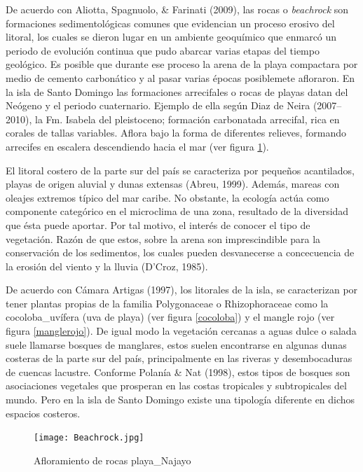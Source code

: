 \documentclass[11pt,]{article}
\begin{document}
De acuerdo con Aliotta, Spagnuolo, \& Farinati (2009), las rocas o
\emph{beachrock} son formaciones sedimentológicas comunes que evidencian
un proceso erosivo del litoral, los cuales se dieron lugar en un
ambiente geoquímico que enmarcó un periodo de evolución continua que
pudo abarcar varias etapas del tiempo geológico. Es posible que durante
ese proceso la arena de la playa compactara por medio de cemento
carbonático y al pasar varias épocas posiblemete afloraron. En la isla
de Santo Domingo las formaciones arrecifales o rocas de playas datan del
Neógeno y el periodo cuaternario. Ejemplo de ella según Diaz de Neira
(2007--2010), la Fm. Isabela del pleistoceno; formación carbonatada
arrecifal, rica en corales de tallas variables. Aflora bajo la forma de
diferentes relieves, formando arrecifes en escalera descendiendo hacia
el mar (ver figura \ref{beachrock_foto}).

El litoral costero de la parte sur del país se caracteriza por pequeños
acantilados, playas de origen aluvial y dunas extensas (Abreu, 1999).
Además, mareas con oleajes extremos típico del mar caribe. No obstante,
la ecología actúa como componente categórico en el microclima de una
zona, resultado de la diversidad que ésta puede aportar. Por tal motivo,
el interés de conocer el tipo de vegetación. Razón de que estos, sobre
la arena son imprescindible para la conservación de los sedimentos, los
cuales pueden desvanecerse a concecuencia de la erosión del viento y la
lluvia (D'Croz, 1985).

De acuerdo con Cámara Artigas (1997), los litorales de la isla, se
caracterizan por tener plantas propias de la familia Polygonaceae o
Rhizophoraceae como la cocoloba\_uvífera (uva de playa) (ver figura
\ref{cocoloba}) y el mangle rojo (ver figura \ref{manglerojo}). De igual
modo la vegetación cercanas a aguas dulce o salada suele llamarse
bosques de manglares, estos suelen encontrarse en algunas dunas costeras
de la parte sur del país, principalmente en las riveras y desembocaduras
de cuencas lacustre. Conforme Polanía \& Nat (1998), estos tipos de
bosques son asociaciones vegetales que prosperan en las costas
tropicales y subtropicales del mundo. Pero en la isla de Santo Domingo
existe una tipología diferente en dichos espacios costeros.

\begin{figure}
\centering
\texttt{[image: Beachrock.jpg]}
\caption{Afloramiento de rocas playa\_Najayo\label{beachrock_foto}}
\end{figure}
\end{document}
